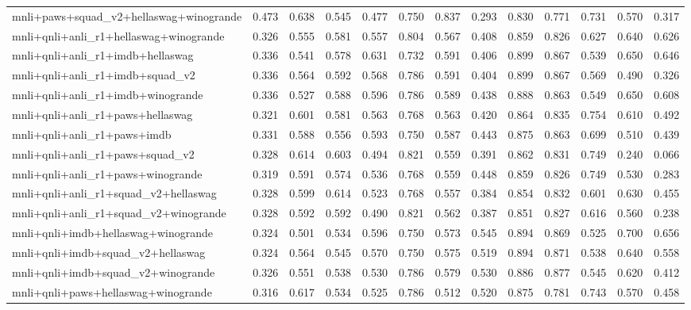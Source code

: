 \begin{table}[t]
\begin{tabular}{lrrrrrrrrrrrr}
    mnli+paws+squad\_v2+hellaswag+winogrande & 0.473 & 0.638 & 0.545 & 0.477 & 0.750 & 0.837 & 0.293 & 0.830 & 0.771 & 0.731 & 0.570 & 0.317 \\
    mnli+qnli+anli\_r1+hellaswag+winogrande & 0.326 & 0.555 & 0.581 & 0.557 & 0.804 & 0.567 & 0.408 & 0.859 & 0.826 & 0.627 & 0.640 & 0.626 \\
    mnli+qnli+anli\_r1+imdb+hellaswag & 0.336 & 0.541 & 0.578 & 0.631 & 0.732 & 0.591 & 0.406 & 0.899 & 0.867 & 0.539 & 0.650 & 0.646 \\
    mnli+qnli+anli\_r1+imdb+squad\_v2 & 0.336 & 0.564 & 0.592 & 0.568 & 0.786 & 0.591 & 0.404 & 0.899 & 0.867 & 0.569 & 0.490 & 0.326 \\
    mnli+qnli+anli\_r1+imdb+winogrande & 0.336 & 0.527 & 0.588 & 0.596 & 0.786 & 0.589 & 0.438 & 0.888 & 0.863 & 0.549 & 0.650 & 0.608 \\
    mnli+qnli+anli\_r1+paws+hellaswag & 0.321 & 0.601 & 0.581 & 0.563 & 0.768 & 0.563 & 0.420 & 0.864 & 0.835 & 0.754 & 0.610 & 0.492 \\
    mnli+qnli+anli\_r1+paws+imdb & 0.331 & 0.588 & 0.556 & 0.593 & 0.750 & 0.587 & 0.443 & 0.875 & 0.863 & 0.699 & 0.510 & 0.439 \\
    mnli+qnli+anli\_r1+paws+squad\_v2 & 0.328 & 0.614 & 0.603 & 0.494 & 0.821 & 0.559 & 0.391 & 0.862 & 0.831 & 0.749 & 0.240 & 0.066 \\
    mnli+qnli+anli\_r1+paws+winogrande & 0.319 & 0.591 & 0.574 & 0.536 & 0.768 & 0.559 & 0.448 & 0.859 & 0.826 & 0.749 & 0.530 & 0.283 \\
    mnli+qnli+anli\_r1+squad\_v2+hellaswag & 0.328 & 0.599 & 0.614 & 0.523 & 0.768 & 0.557 & 0.384 & 0.854 & 0.832 & 0.601 & 0.630 & 0.455 \\
    mnli+qnli+anli\_r1+squad\_v2+winogrande & 0.328 & 0.592 & 0.592 & 0.490 & 0.821 & 0.562 & 0.387 & 0.851 & 0.827 & 0.616 & 0.560 & 0.238 \\
    mnli+qnli+imdb+hellaswag+winogrande & 0.324 & 0.501 & 0.534 & 0.596 & 0.750 & 0.573 & 0.545 & 0.894 & 0.869 & 0.525 & 0.700 & 0.656 \\
    mnli+qnli+imdb+squad\_v2+hellaswag & 0.324 & 0.564 & 0.545 & 0.570 & 0.750 & 0.575 & 0.519 & 0.894 & 0.871 & 0.538 & 0.640 & 0.558 \\
    mnli+qnli+imdb+squad\_v2+winogrande & 0.326 & 0.551 & 0.538 & 0.530 & 0.786 & 0.579 & 0.530 & 0.886 & 0.877 & 0.545 & 0.620 & 0.412 \\
    mnli+qnli+paws+hellaswag+winogrande & 0.316 & 0.617 & 0.534 & 0.525 & 0.786 & 0.512 & 0.520 & 0.875 & 0.781 & 0.743 & 0.570 & 0.458 \\

\end{tabular}
\end{table}
